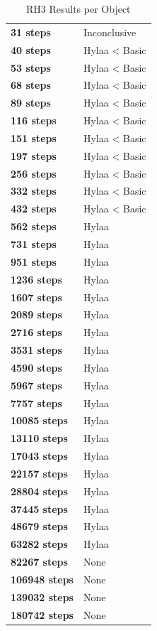 \documentclass{article}\usepackage[]{graphicx}\usepackage[]{color}
\begin{document}
	
	\begin{table}[H]
	\centering
	\caption{RH3 Results per Object}
	\begin{tabular}{ll}
	\textbf{31 steps} & Inconclusive \\
	\textbf{40 steps} & Hylaa \textless{} Basic \\
	\textbf{53 steps} & Hylaa \textless{} Basic \\
	\textbf{68 steps} & Hylaa \textless{} Basic \\
	\textbf{89 steps} & Hylaa \textless{} Basic \\
	\textbf{116 steps} & Hylaa \textless{} Basic \\
	\textbf{151 steps} & Hylaa \textless{} Basic \\
	\textbf{197 steps} & Hylaa \textless{} Basic \\
	\textbf{256 steps} & Hylaa \textless{} Basic \\
	\textbf{332 steps} & Hylaa \textless{} Basic \\
	\textbf{432 steps} & Hylaa \textless{} Basic \\
	\textbf{562 steps} & Hylaa \\
	\textbf{731 steps} & Hylaa \\
	\textbf{951 steps} & Hylaa \\
	\textbf{1236 steps} & Hylaa \\
	\textbf{1607 steps} & Hylaa \\
	\textbf{2089 steps} & Hylaa \\
	\textbf{2716 steps} & Hylaa \\
	\textbf{3531 steps} & Hylaa \\
	\textbf{4590 steps} & Hylaa \\
	\textbf{5967 steps} & Hylaa \\
	\textbf{7757 steps} & Hylaa \\
	\textbf{10085 steps} & Hylaa \\
	\textbf{13110 steps} & Hylaa \\
	\textbf{17043 steps} & Hylaa \\
	\textbf{22157 steps} & Hylaa \\
	\textbf{28804 steps} & Hylaa \\
	\textbf{37445 steps} & Hylaa \\
	\textbf{48679 steps} & Hylaa \\
	\textbf{63282 steps} & Hylaa \\
	\textbf{82267 steps} & None \\
	\textbf{106948 steps} & None \\
	\textbf{139032 steps} & None \\
	\textbf{180742 steps} & None \\
	\end{tabular}
	\end{table}
\end{document}
